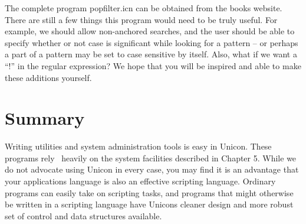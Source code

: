 The complete program \textsf{popfilter.icn} can be obtained from the
book{\textquotesingle}s website. There are still a few things this
program would need to be truly useful. For example, we should allow
non-anchored searches, and the user should be able to specify whether
or not case is significant while looking for a pattern -- or perhaps a
part of a pattern may be set to case sensitive by itself. Also, what if
we want a {\textquotedblleft}!{\textquotedblright} in the regular
expression? We hope that you will be inspired and able to make these
additions yourself.

\section*{Summary}

Writing utilities and system administration tools is easy in Unicon.
These programs rely \ heavily on the system facilities described in
Chapter 5. While we do not advocate using Unicon in every case, you may
find it is an advantage that your applications language is also an
effective scripting language. Ordinary programs can easily take on
scripting tasks, and programs that might otherwise be written in a
scripting language have Unicon{\textquotesingle}s cleaner design and
more robust set of control and data structures available.


\bigskip
